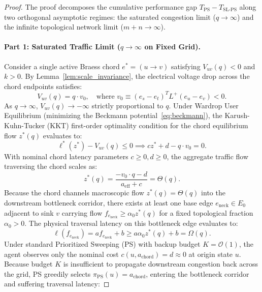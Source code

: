 \documentclass[11pt,a4paper]{article}
\begin{document}
\begin{proof}
The proof decomposes the cumulative performance gap $T_{\text{PS}} - T_{\text{SL-PS}}$ along two orthogonal asymptotic regimes: the saturated congestion limit ($q \to \infty$) and the infinite topological network limit ($m + n \to \infty$).

\paragraph{Part 1: Saturated Traffic Limit ($q \to \infty$ on Fixed Grid).}
Consider a single active Braess chord $e^* = (u \to v)$ satisfying $V_{uv}(q) < 0$ and $k > 0$. By Lemma~\ref{lem:scale_invariance}, the electrical voltage drop across the chord endpoints satisfies:
\begin{equation}
V_{uv}(q) = q \cdot v_0, \quad \text{where } v_0 \equiv (e_s - e_t)^T L^+ (e_u - e_v) < 0.
\end{equation}
As $q \to \infty$, $V_{uv}(q) \to -\infty$ strictly proportional to $q$. Under Wardrop User Equilibrium (minimizing the Beckmann potential~\eqref{eq:beckmann}), the Karush-Kuhn-Tucker (KKT) first-order optimality condition for the chord equilibrium flow $z^*(q)$ evaluates to:
\begin{equation}
\ell^*(z^*) - V_{uv}(q) \le 0 \implies c z^* + d - q \cdot v_0 = 0.
\end{equation}
With nominal chord latency parameters $c \ge 0, d \ge 0$, the aggregate traffic flow traversing the chord scales as:
\begin{equation}
z^*(q) = \frac{-v_0 \cdot q - d}{a_{\text{eff}} + c} = \Theta(q).
\end{equation}
Because the chord channels macroscopic flow $z^*(q) = \Theta(q)$ into the downstream bottleneck corridor, there exists at least one base edge $e_{\text{neck}} \in E_0$ adjacent to sink $v$ carrying flow $f_{e_{\text{neck}}} \ge \alpha_0 z^*(q)$ for a fixed topological fraction $\alpha_0 > 0$. The physical traversal latency on this bottleneck edge evaluates to:
\begin{equation}
\ell(f_{e_{\text{neck}}}) = a f_{e_{\text{neck}}} + b \ge a \alpha_0 z^*(q) + b = \Omega(q).
\end{equation}
Under standard Prioritized Sweeping (PS) with backup budget $K = \mathcal{O}(1)$, the agent observes only the nominal cost $c(u, a_{\text{chord}}) = d \approx 0$ at origin state $u$. Because budget $K$ is insufficient to propagate downstream congestion back across the grid, PS greedily selects $\pi_{\text{PS}}(u) = a_{\text{chord}}$, entering the bottleneck corridor and suffering traversal latency:

\end{proof}
\end{document}
